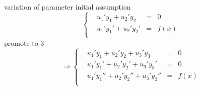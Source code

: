 \documentclass{beamer}
\begin{document}
\begin{frame}{variation of parameter}
initial assumption
\[
 \left\{\begin{matrix}
        &u_1'y_1+u_2'y_2&=&0\\
        &u_1'y_1'+u_2'y_2'&=&f(x)\\
       \end{matrix}
 \right.

\]
promote to 3
\[\Rightarrow
 \left\{\begin{matrix}
        &u_1'y_1+u_2'y_2+u_3'y_3&=&0\\
        &u_1'y_1'+u_2'y_2'+u_3'y_3'&=&0\\
        &u_1'y_1''+u_2'y_2''+u_3'y_3''&=&f(x)\\
       \end{matrix}
 \right.

\]
\end{frame}
\end{document}
